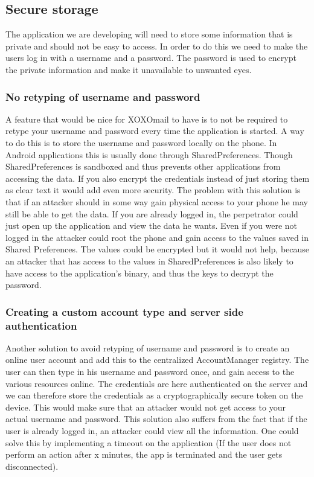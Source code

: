 \subsection{Secure storage}
The application we are developing will need to store some information that is private and should not be easy to access. In order to do this we need to make the users log in with a username and a password. The password is used to encrypt the private information and make it unavailable to unwanted eyes.  

\subsubsection{No retyping of username and password}
A feature that would be nice for XOXOmail to have is to not be required to retype your username and password every time the application is started.
\newline
\newline
A way to do this is to store the username and password locally on the phone. In Android applications this is usually done through SharedPreferences. Though SharedPreferences is sandboxed and thus prevents other applications from accessing the data. If you also encrypt the credentials instead of just storing them as clear text it would add even more security.
\newline
\newline
The problem with this solution is that if an attacker should in some way gain physical access to your phone he may still be able to get the data. If you are already logged in, the perpetrator could just open up the application and view the data he wants. Even if you were not logged in the attacker could root the phone and gain access to the values saved in Shared Preferences. The values could be encrypted but it would not help, because an attacker that has access to the values in SharedPreferences is also likely to have access to the application’s binary, and thus the keys to decrypt the password.


\subsubsection{Creating a custom account type and server side authentication}
Another solution to avoid retyping of username and password is to create an online user account and add this to the centralized AccountManager registry. The user can then type in his username and password once, and gain access to the various resources online. The credentials are here authenticated on the server and we can therefore store the credentials as a cryptographically secure token on the device. This would make sure that an attacker would not get access to your actual username and password.
\newline
\newline
This solution also suffers from the fact that if the user is already logged in, an attacker could view all the information. One could solve this by implementing a timeout on the application (If the user does not perform an action after x minutes, the app is terminated and the user gets disconnected).

